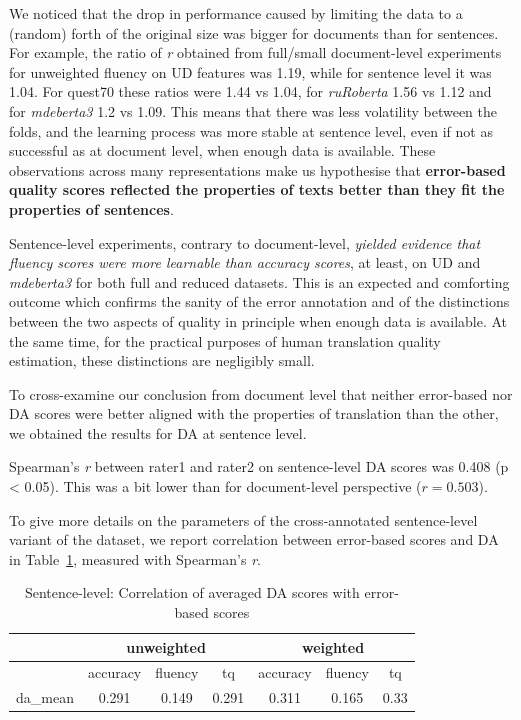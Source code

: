 We noticed that the drop in performance caused by limiting the data to a (random) forth of the original size was bigger for documents than for sentences. For example, the ratio of \textit{r} obtained from full/small document-level experiments for unweighted fluency on UD features was 1.19, while for sentence level it was 1.04. For quest70 these ratios were 1.44 vs 1.04, for \textit{ruRoberta} 1.56 vs 1.12 and for \textit{mdeberta3} 1.2 vs 1.09.
This means that there was less volatility between the folds, and the learning process was more stable at sentence level, even if not as successful as at document level, when enough data is available. 
These observations across many representations make us hypothesise that \textbf{error-based quality scores reflected the properties of texts better than they fit the properties of sentences}. 

Sentence-level experiments, contrary to document-level, \textit{yielded evidence that fluency scores were more learnable than accuracy scores}, at least, on UD and \textit{mdeberta3} for both full and reduced datasets. 
This is an expected and comforting outcome which confirms the sanity of the error annotation and of the distinctions between the two aspects of quality in principle when enough data is available. At the same time, for the practical purposes of human translation quality estimation, these distinctions are negligibly small. 

To cross-examine our conclusion from document level that neither error-based nor DA scores were better aligned with the properties of translation than the other, we obtained the results for DA at sentence level. 

Spearman's \textit{r} between rater1 and rater2 on sentence-level DA scores was 0.408 (p < 0.05). This was a bit lower than for document-level perspective ($r=0.503$).

To give more details on the parameters of the cross-annotated sentence-level variant of the dataset, we report correlation between error-based scores and DA in Table~\ref{tab:sent_err-da_corr}, measured with Spearman's \textit{r}.

\begin{table}[H]
	\centering
	\begin{tabular}{l|ccc|ccc}
		\toprule
		& \multicolumn{3}{c|}{unweighted} & \multicolumn{3}{c}{weighted} \\
		\midrule
		& accuracy   & fluency & tq    & accuracy & fluency & tq    \\
		\midrule
		da\_mean & 0.291 & 0.149 & 0.291 & 0.311 & 0.165 & 0.33 \\
		\bottomrule
	\end{tabular}
	\caption{\label{tab:sent_err-da_corr}Sentence-level: Correlation of averaged DA scores with error-based scores}
\end{table}

